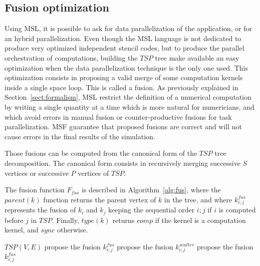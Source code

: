 \subsection{Fusion optimization}
\label{sect:fusion}

Using MSL, it is possible to ask for data parallelization of the application, or for an hybrid parallelization. Even though the MSL language is not dedicated to produce very optimized independent stencil codes, but to produce the parallel orchestration of computations, building the $TSP$ tree make available an easy optimization when the data parallelization technique is the only one used. 
This optimization consists in proposing a valid merge of some computation kernels inside a single space loop. This is called a fusion. As previously explained in Section~\ref{sect:formalism}, MSL restrict the definition of a numerical computation by writing a single quantity at a time which is more natural for numericians, and which avoid errors in manual fusion or counter-productive fusions for task parallelization. MSF guarantee that proposed fusions are correct and will not cause errors in the final results of the simulation.

Those fusions can be computed from the canonical form of the $TSP$ tree decomposition. The canonical form consists in recursively merging successive $S$ vertices or successive $P$ vertices of $TSP$.

The fusion function $F_{fus}$ is described in Algorithm~\ref{alg:fus}, where the $parent(k)$ function returns the parent vertex of $k$ in the tree, and where $k_{i;j}^{fus}$ represents the fusion of $k_i$ and $k_j$ keeping the sequential order $i;j$ if $i$ is computed before $j$ in $TSP$. Finally, $type(k)$ returns $comp$ if the kernel is a computation kernel, and $sync$ otherwise.

\begin{algorithm}
\caption{$F_{fus}$}
\label{alg:fus}
\begin{algorithmic}[1]
 {$TSP(V,E)$}
\State propose the fusion $k_{i;j}^{fus}$
\Else
{}
\State propose the fusion $k_{i;j}^{scatter}$
\EndIf
\EndIf
{}
\State propose the fusion $k_{i;j}^{fus}$
\EndIf
\EndIf
\EndIf
\EndIf
\EndFor
\EndProcedure
\end{algorithmic}
\end{algorithm}

